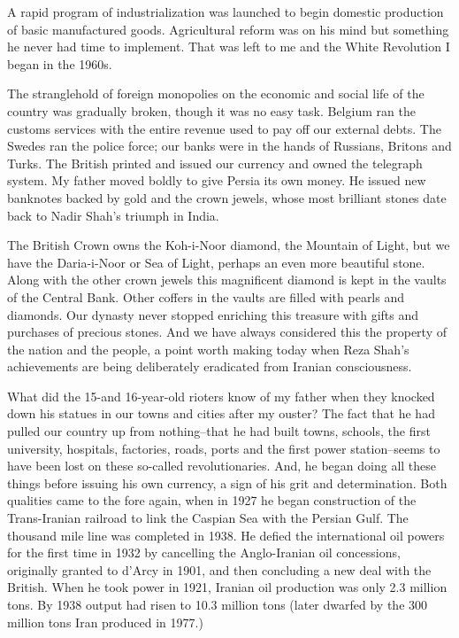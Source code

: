 A rapid program of industrialization was launched to begin domestic production of basic manufactured goods. Agricultural reform was on his mind but something he never had time to implement. That was left to me and the White Revolution I began in the 1960s. 

The stranglehold of foreign monopolies on the economic and social life of the country was gradually broken, though it was no easy task. Belgium ran the customs services with the entire revenue used to pay off our external debts. The Swedes ran the police force; our banks were in the hands of Russians, Britons and Turks. The British printed and issued our currency and owned the telegraph system. My father moved boldly to give Persia its own money. He issued new banknotes backed by gold and the crown jewels, whose most brilliant stones date back to Nadir Shah's triumph in India. 

The British Crown owns the Koh-i-Noor diamond, the Mountain of Light, but we have the Daria-i-Noor or Sea of Light, perhaps an even more beautiful stone. Along with the other crown jewels this magnificent diamond is kept in the vaults of the Central Bank. Other coffers in the vaults are filled with pearls and diamonds. Our dynasty never stopped enriching this treasure with gifts and purchases of precious stones. And we have always considered this the property of the nation and the people, a point worth making today when Reza Shah's achievements are being deliberately eradicated from Iranian consciousness. 

What did the 15-and 16-year-old rioters know of my father when they knocked down his statues in our towns and cities after my ouster? The fact that he had pulled our country up from nothing--that he had built towns, schools, the first university, hospitals, factories, roads, ports and the first power station--seems to have been lost on these so-called revolutionaries. And, he began doing all these things before issuing his own currency, a sign of his grit and determination. Both qualities came to the fore again, when in 1927 he began construction of the Trans-Iranian railroad to link the Caspian Sea with the Persian Gulf. The thousand mile line was completed in 1938. He defied the international oil powers for the first time in 1932 by cancelling the Anglo-Iranian oil concessions, originally granted to d'Arcy in 1901, and then concluding a new deal with the British. When he took power in 1921, Iranian oil production was only 2.3 million tons. By 1938 output had risen to 10.3 million tons (later dwarfed by the 300 million tons Iran produced in 1977.) 

